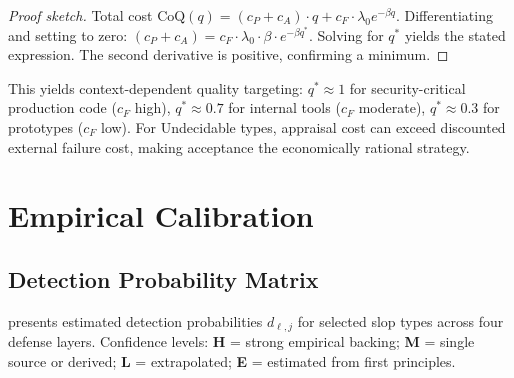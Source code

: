 \documentclass[11pt, a4paper, copyright]{googledeepmind}
\begin{document}
\begin{proof}[Proof sketch]
Total cost $\text{CoQ}(q) = (c_P + c_A) \cdot q + c_F \cdot \lambda_0 e^{-\beta q}$. Differentiating and setting to zero: $(c_P + c_A) = c_F \cdot \lambda_0 \cdot \beta \cdot e^{-\beta q^*}$. Solving for $q^*$ yields the stated expression. The second derivative is positive, confirming a minimum.
\end{proof}

This yields context-dependent quality targeting: $q^* \approx 1$ for security-critical production code ($c_F$ high), $q^* \approx 0.7$ for internal tools ($c_F$ moderate), $q^* \approx 0.3$ for prototypes ($c_F$ low). For Undecidable types, appraisal cost can exceed discounted external failure cost, making acceptance the economically rational strategy.


\section{Empirical Calibration}
\label{sec:empirical}

\subsection{Detection Probability Matrix}

 presents estimated detection probabilities $d_{\ell,j}$ for selected slop types across four defense layers. Confidence levels: \textbf{H} = strong empirical backing; \textbf{M} = single source or derived; \textbf{L} = extrapolated; \textbf{E} = estimated from first principles.
\end{document}
